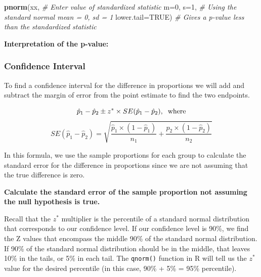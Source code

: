 \documentclass[
]{report}
\newenvironment{Shaded}{\begin{snugshade}}{\end{snugshade}}
\newcommand{\AttributeTok}[1]{\textcolor[rgb]{0.13,0.29,0.53}{#1}}
\newcommand{\CommentTok}[1]{\textcolor[rgb]{0.56,0.35,0.01}{\textit{#1}}}
\newcommand{\ConstantTok}[1]{\textcolor[rgb]{0.56,0.35,0.01}{#1}}
\newcommand{\DecValTok}[1]{\textcolor[rgb]{0.00,0.00,0.81}{#1}}
\newcommand{\FunctionTok}[1]{\textcolor[rgb]{0.13,0.29,0.53}{\textbf{#1}}}
\newcommand{\NormalTok}[1]{#1}
\begin{document}
\begin{Shaded}
\begin{Highlighting}[]
\FunctionTok{pnorm}\NormalTok{(xx, }\CommentTok{\# Enter value of standardized statistic}
      \AttributeTok{m=}\DecValTok{0}\NormalTok{, }\AttributeTok{s=}\DecValTok{1}\NormalTok{, }\CommentTok{\# Using the standard normal mean = 0, sd = 1}
      \AttributeTok{lower.tail=}\ConstantTok{TRUE}\NormalTok{) }\CommentTok{\# Gives a p{-}value less than the standardized statistic}
\end{Highlighting}
\end{Shaded}

\textbf{Interpretation of the p-value:}

\vspace{1in}

\subsubsection*{Confidence Interval}\label{confidence-interval-2}

To find a confidence interval for the difference in proportions we will add and subtract the margin of error from the point estimate to find the two endpoints.

\[\hat{p}_1-\hat{p}_2\pm z^*\times SE(\hat{p}_1-\hat{p}_2), \hspace{.2cm} \text{where}\]
\[SE(\hat{p}_1-\hat{p}_2) = \sqrt{\frac{\hat{p}_1 \times  (1-\hat{p}_1)}{n_1}+\frac{\hat{p}_2 \times  (1-\hat{p}_2)}{n_2}}\]

In this formula, we use the sample proportions for each group to calculate the standard error for the difference in proportions since we are not assuming that the true difference is zero.

\textbf{Calculate the standard error of the sample proportion not assuming the null hypothesis is true.}

\vspace{0.8in}
\newpage

Recall that the \(z^*\) multiplier is the percentile of a standard normal distribution that corresponds to our confidence level. If our confidence level is 90\%, we find the Z values that encompass the middle 90\% of the standard normal distribution. If 90\% of the standard normal distribution should be in the middle, that leaves 10\% in the tails, or 5\% in each tail. The \texttt{qnorm()} function in R will tell us the \(z^*\) value for the desired percentile (in this case, 90\% + 5\% = 95\% percentile).
\end{document}
